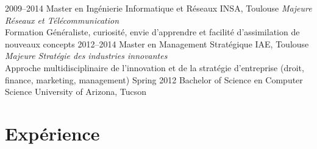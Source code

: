 \documentclass[]{friggeri-cv} %
\begin{document}
\begin{entrylist}
\entry
{2009--2014}
{Master {\normalfont en Ingénierie Informatique et Réseaux}}
{INSA, Toulouse}
{\emph{Majeure Réseaux et Télécommunication}\\
Formation Généraliste, curiosité, envie d'apprendre et facilité d'assimilation de nouveaux concepts
\vspace{.2cm}}
\entry
{2012--2014}
{Master {\normalfont en Management Stratégique}}
{IAE, Toulouse}
{\emph{Majeure Stratégie des industries innovantes}\\
Approche multidisciplinaire de l'innovation et de la stratégie d'entreprise (droit, finance, marketing, management)
\vspace{.2cm}}
\entry
{Spring 2012}
{Bachelor of Science {\normalfont en Computer Science}}
{University of Arizona, Tucson}
{\vspace{-10pt}}
\end{entrylist}


\section{Expérience}
\end{document}

